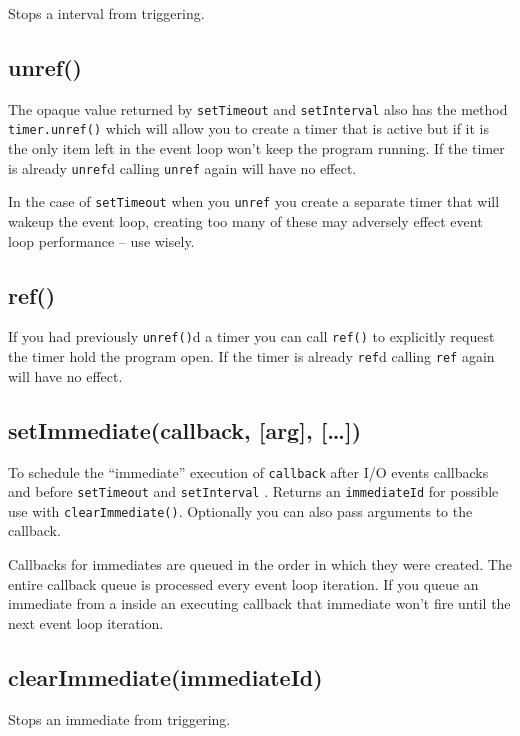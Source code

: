 Stops a interval from triggering.

\subsection{unref()}\label{unref}

The opaque value returned by \texttt{setTimeout} and
\texttt{setInterval} also has the method \texttt{timer.unref()} which
will allow you to create a timer that is active but if it is the only
item left in the event loop won't keep the program running. If the timer
is already \texttt{unref}d calling \texttt{unref} again will have no
effect.

In the case of \texttt{setTimeout} when you \texttt{unref} you create a
separate timer that will wakeup the event loop, creating too many of
these may adversely effect event loop performance -- use wisely.

\subsection{ref()}\label{ref}

If you had previously \texttt{unref()}d a timer you can call
\texttt{ref()} to explicitly request the timer hold the program open. If
the timer is already \texttt{ref}d calling \texttt{ref} again will have
no effect.

\subsection{setImmediate(callback, {[}arg{]},
{[}\ldots{}{]})}\label{setimmediatecallback-arg}

To schedule the ``immediate'' execution of \texttt{callback} after I/O
events callbacks and before \texttt{setTimeout} and \texttt{setInterval}
. Returns an \texttt{immediateId} for possible use with
\texttt{clearImmediate()}. Optionally you can also pass arguments to the
callback.

Callbacks for immediates are queued in the order in which they were
created. The entire callback queue is processed every event loop
iteration. If you queue an immediate from a inside an executing callback
that immediate won't fire until the next event loop iteration.

\subsection{clearImmediate(immediateId)}\label{clearimmediateimmediateid}

Stops an immediate from triggering.
